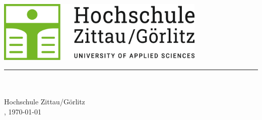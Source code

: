 \begin{titlepage}
    \begin{center}

        \vspace*{1cm}
        \includegraphics[width=0.75\textwidth]{images/hszg_logo.png}
        \vspace*{0.5cm}
        \hrule
        \vspace*{2cm}
        
        \Huge
        \textbf{\thesisTitle}
        
        \vspace*{0.5cm}
        \LARGE
        \thesisType

        \vfill
        
        \Large
        \authorName\\
        \vspace*{0.5cm}
        \faculty\\
        Hochschule Zittau/Görlitz\\
        \place, \today\\
        
    \end{center}
\end{titlepage}